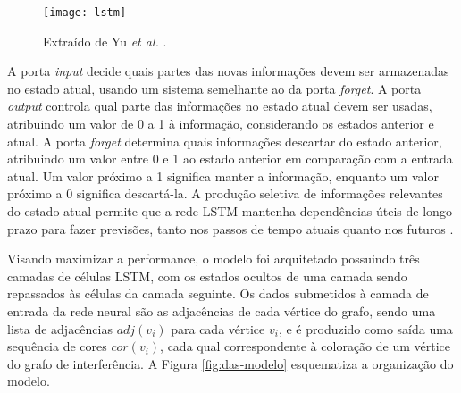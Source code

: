 \documentclass[
	12pt,				%
	openright,			%
	oneside,			%
	a4paper,			%
	tccpreliminar,			%
	]{ABNT-DC-UEL}
\begin{document}
\begin{figure}[hbt]
    \centering
    \texttt{[image: lstm]}
    \caption{Extraído de Yu \textit{et al.} \cite{yu:19}.}
    \label{fig:lstm}
\end{figure}

A porta \textit{input} decide quais partes das novas informações devem ser armazenadas no estado atual, usando um sistema semelhante ao da porta \textit{forget}. A porta \textit{output} controla qual parte das informações no estado atual devem ser usadas, atribuindo um valor de 0 a 1 à informação, considerando os estados anterior e atual. A porta \textit{forget} determina quais informações descartar do estado anterior, atribuindo um valor entre 0 e 1 ao estado anterior em comparação com a entrada atual. Um valor próximo a 1 significa manter a informação, enquanto um valor próximo a 0 significa descartá-la. A produção seletiva de informações relevantes do estado atual permite que a rede LSTM mantenha dependências úteis de longo prazo para fazer previsões, tanto nos passos de tempo atuais quanto nos futuros \cite{yu:19, das:20}.

Visando maximizar a performance, o modelo foi arquitetado possuindo três camadas de células LSTM, com os estados ocultos de uma camada sendo repassados às células da camada seguinte. Os dados submetidos à camada de entrada da rede neural são as adjacências de cada vértice do grafo, sendo uma lista de adjacências $\mathit{adj}(v_i)$ para cada vértice $v_i$, e é produzido como saída uma sequência de cores $\mathit{cor}(v_i)$, cada qual correspondente à coloração de um vértice do grafo de interferência. A Figura \ref{fig:das-modelo} esquematiza a organização do modelo.
\end{document}
